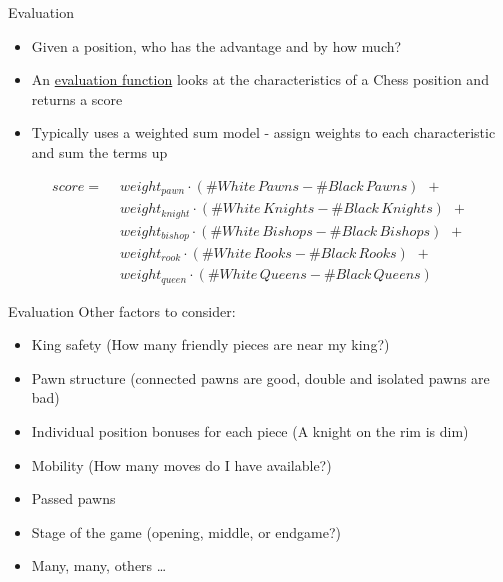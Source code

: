 \documentclass[xcolor=pdftex,dvipsnames,table]{beamer}
\begin{document}
\begin{frame}{Evaluation}
\begin{itemize}
\item Given a position, who has the advantage and by how much?
\item An \underline{evaluation function} looks at the characteristics of a Chess position and returns a score
\item Typically uses a weighted sum model - assign weights to each characteristic and sum the terms up
\end{itemize}
\vspace{5pt}
\begin{equation*}
\begin{split}
score = \hspace{5pt} & weight_{pawn}\cdot(\# White\,Pawns - \# Black\,Pawns) \hspace{5pt} + \\
		& weight_{knight}\cdot(\# White\,Knights - \# Black\,Knights) \hspace{5pt} + \\
        & weight_{bishop}\cdot(\# White\,Bishops - \# Black\,Bishops) \hspace{5pt} + \\
        & weight_{rook}\cdot(\# White\,Rooks - \# Black\,Rooks) \hspace{5pt} + \\
        & weight_{queen}\cdot(\# White\,Queens - \# Black\,Queens) \hspace{5pt}
\end{split}
\end{equation*}
\end{frame}

\begin{frame}{Evaluation}
Other factors to consider:
\begin{itemize}
\item King safety (How many friendly pieces are near my king?)
\item Pawn structure (connected pawns are good, double and isolated pawns are bad)
\item Individual position bonuses for each piece (A knight on the rim is dim)
\item Mobility (How many moves do I have available?)
\item Passed pawns
\item Stage of the game (opening, middle, or endgame?)
\item Many, many, others \dots
\end{itemize}
\end{frame}
\end{document}

